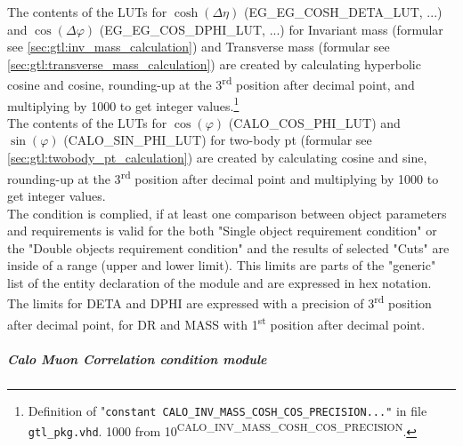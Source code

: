 The contents of the LUTs for $\cosh(\Delta\eta)$ (\small{EG\_EG\_COSH\_DETA\_LUT}\normalsize, ...) and $\cos(\Delta\varphi)$ (\small{EG\_EG\_COS\_DPHI\_LUT}\normalsize, ...) for Invariant mass
(formular see \ref{sec:gtl:inv_mass_calculation}) and Transverse mass (formular see \ref{sec:gtl:transverse_mass_calculation}) are created by calculating hyperbolic cosine and cosine, rounding-up at the 3\textsuperscript{rd} position after decimal point,
and multiplying by 1000 to get integer values.\footnote{Definition of "\texttt{constant \small{CALO\_INV\_MASS\_COSH\_COS\_PRECISION}\normalsize ..."} in file \texttt{gtl\_pkg.vhd}.
1000 from 10\textsuperscript{\tiny{CALO\_INV\_MASS\_COSH\_COS\_PRECISION}}\normalsize.}\\
The contents of the LUTs for $\cos(\varphi)$ (\small{CALO\_COS\_PHI\_LUT}\normalsize) and $\sin(\varphi)$ (\small{CALO\_SIN\_PHI\_LUT}\normalsize) for two-body pt
(formular see \ref{sec:gtl:twobody_pt_calculation}) are created by calculating cosine and sine, rounding-up at the 3\textsuperscript{rd} position after decimal point and 
multiplying by 1000 to get integer values.\\
The condition is complied, if at least one comparison between object parameters and requirements is valid for the both "Single object requirement condition" or the "Double objects requirement condition"
and the results of selected "Cuts" are inside of a range (upper and lower limit).
This limits are parts of the "generic" list of the entity declaration of the module and are expressed in hex notation. The limits for DETA and DPHI
are expressed with a precision of 3\textsuperscript{rd} position after decimal point, for DR and MASS with 1\textsuperscript{st} position after decimal point.

\subparagraph{Calo Muon Correlation condition module}
\label{sec:gtl:calo_muon_correlation_condition_module}

